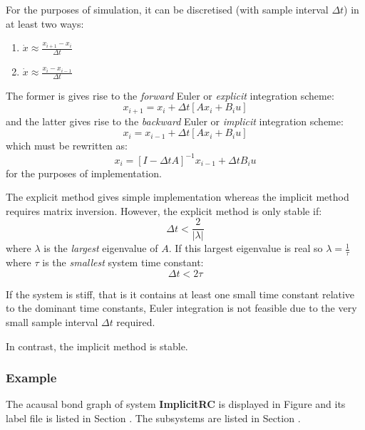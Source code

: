 For the purposes of simulation, it can be discretised (with sample
interval $\Delta t$) in at least two
ways:
\begin{enumerate}
\item $ \dot x \approx \frac{x_{i+1} - x_{i}}{\Delta t}$
\item $ \dot x \approx \frac{x_{i} - x_{i-1}}{\Delta t}$
\end{enumerate}
The former is gives rise to the \emph{forward} Euler or \emph{explicit}
integration scheme:
\begin{equation}
   x_{i+1} =  x_{i} + \Delta t \left [ A x_{i} + B_{i} u \right ]
\end{equation}
and the latter gives rise to the \emph{backward} Euler or \emph{implicit}
integration scheme:
\begin{equation}
   x_{i} =  x_{i-1} + \Delta t \left [ A x_{i} + B_{i} u \right ]
\end{equation}
which must be rewritten as:
\begin{equation}
   x_{i} =   \left [ I -  \Delta t A \right ]^{-1} x_{i-1} + \Delta t  B_{i} u
\end{equation}
for the purposes of implementation.

The explicit method gives simple implementation whereas the implicit
method requires matrix inversion. However, the explicit method is only
stable if:
\begin{equation}
  \Delta t < \frac{2}{| \lambda |}
\end{equation}
where $\lambda$ is the \emph{largest} eigenvalue of $A$. If this
largest eigenvalue is real so $\lambda = \frac{1}{\tau}$ where $\tau$
is the \emph{smallest} system time constant:
\begin{equation}
  \Delta t < 2 \tau
\end{equation}

If the system is stiff, that is it contains at least one small time
constant relative to the dominant time constants, Euler integration is
not feasible due to the very small sample interval $\Delta t$
required.

In contrast, the implicit method is stable.


\subsubsection{Example}
   The acausal bond graph of system \textbf{ImplicitRC} is
   displayed in Figure  and its label
   file is listed in Section .
   The subsystems are listed in Section .

